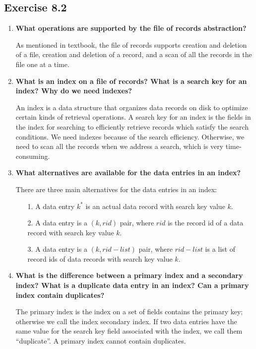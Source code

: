 \subsection{Exercise 8.2}
\begin{enumerate}
\item {\bf What operations are supported by the file of records abstraction?}

As mentioned in textbook, the file of records supports creation and deletion of a file, creation and deletion of a record, and a scan of all the records in the file one at a time.

\item {\bf What is an index on a file of records? What is a search key for an index? Why do we need indexes?}

An index is a data structure that organizes data records on disk to optimize certain kinds of retrieval operations.  A search key for an index is the fields in the index for searching to efficiently retrieve records which satisfy the search conditions.  We need indexes because of the search efficiency.  Otherwise, we need to scan all the records when we address a search, which is very time-consuming.

\item {\bf What alternatives are available for the data entries in an index?}

There are three main alternatives for the data entries in an index:

\begin{itemize}
\item [1.] A data entry $k^*$ is an actual data record with search key value $k$.
\item [2.] A data entry is a $(k, rid)$ pair, where $rid$ is the record id of a data record with search key value $k$.
\item [3.] A data entry is a $(k, rid-list)$ pair, where $rid-list$ is a list of record ids of data records with search key value $k$.
\end{itemize}

\item {\bf What is the difference between a primary index and a secondary index? What is a duplicate data entry in an index? Can a primary index contain duplicates?}

The primary index is the index on a set of fields contains the primary key; otherwise we call the index secondary index.  If two data entries have the same value for the search key field associated with the index, we call them ``duplicate''.  A primary index cannot contain duplicates.


\end{enumerate}
